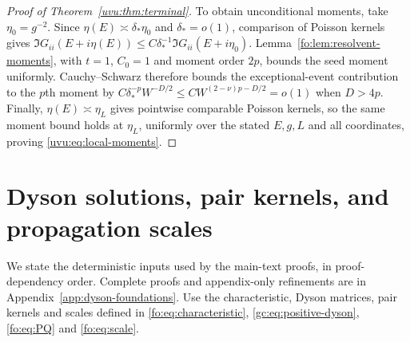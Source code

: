 \documentclass[11pt]{article}
\numberwithin{equation}{section}
\theoremstyle{remark}
\begin{document}
\begin{proof}[Proof of Theorem~\ref{uvu:thm:terminal}]
To obtain unconditional moments, take $\eta_0=g^{-2}$.
Since $\eta(E)\asymp\delta_*\eta_0$ and $\delta_*=o(1)$,
comparison of Poisson kernels gives
$\Im G_{ii}(E+i\eta(E))\le C\delta_*^{-1}\Im G_{ii}(E+i\eta_0)$.
Lemma~\ref{fo:lem:resolvent-moments}, with $t=1$, $C_0=1$
and moment order $2p$, bounds the seed moment uniformly.
Cauchy--Schwarz therefore bounds the exceptional-event contribution
to the $p$th moment by
$C\delta_*^{-p}W^{-D/2}\le CW^{(2-\nu)p-D/2}=o(1)$ when $D>4p$.
Finally, $\eta(E)\asymp\eta_L$ gives pointwise comparable Poisson
kernels, so the same moment bound holds at $\eta_L$, uniformly over
the stated $E,g,L$ and all coordinates, proving \eqref{uvu:eq:local-moments}.
\end{proof}

\section{Dyson solutions, pair kernels, and propagation scales}
\label{sec:lower-deterministic}\label{sec:scalar-dyson-regularity}\label{sec:deterministic-inputs}
We state the deterministic inputs used by the main-text proofs, in
proof-dependency order. Complete proofs and appendix-only refinements
are in Appendix~\ref{app:dyson-foundations}.
Use the characteristic, Dyson matrices, pair kernels and scales defined in
\eqref{fo:eq:characteristic}, \eqref{gc:eq:positive-dyson},
\eqref{fo:eq:PQ} and \eqref{fo:eq:scale}.
\end{document}
